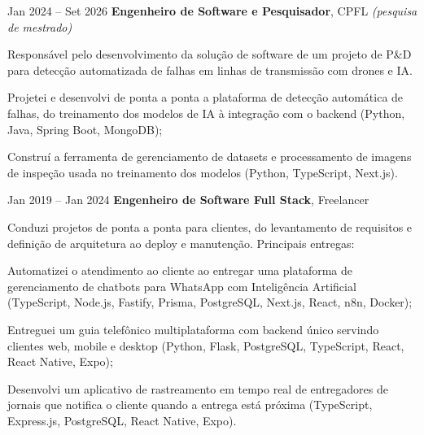 \vspace{0.2 cm}

\begin{twocolentry}{Jan 2024 – Set 2026}
\textbf{Engenheiro de Software e Pesquisador}, CPFL \textit{(pesquisa de mestrado)}\end{twocolentry}
\vspace{0.10 cm}
\begin{onecolentry}
    Responsável pelo desenvolvimento da solução de software de um projeto de P\&D para detecção automatizada de falhas em linhas de transmissão com drones e IA.
    \begin{highlights}
        \item Projetei e desenvolvi de ponta a ponta a plataforma de detecção automática de falhas, do treinamento dos modelos de IA à integração com o backend (Python, Java, Spring Boot, MongoDB);
        \item Construí a ferramenta de gerenciamento de datasets e processamento de imagens de inspeção usada no treinamento dos modelos (Python, TypeScript, Next.js).
    \end{highlights}
\end{onecolentry}


\vspace{0.2 cm}

\begin{twocolentry}{Jan 2019 – Jan 2024}
\textbf{Engenheiro de Software Full Stack}, Freelancer\end{twocolentry}
\vspace{0.10 cm}
\begin{onecolentry}
    Conduzi projetos de ponta a ponta para clientes, do levantamento de requisitos e definição de arquitetura ao deploy e manutenção. Principais entregas:
    \begin{highlights}
        \item Automatizei o atendimento ao cliente ao entregar uma plataforma de gerenciamento de chatbots para WhatsApp com Inteligência Artificial (TypeScript, Node.js, Fastify, Prisma, PostgreSQL, Next.js, React, n8n, Docker);
        \item Entreguei um guia telefônico multiplataforma com backend único servindo clientes web, mobile e desktop (Python, Flask, PostgreSQL, TypeScript, React, React Native, Expo);
        \item Desenvolvi um aplicativo de rastreamento em tempo real de entregadores de jornais que notifica o cliente quando a entrega está próxima (TypeScript, Express.js, PostgreSQL, React Native, Expo).
    \end{highlights}
\end{onecolentry}


